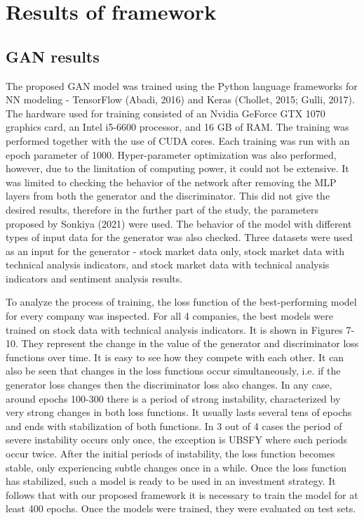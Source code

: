 \documentclass[review]{elsarticle} %
\begin{document}
\section{Results of framework}

\subsection{GAN results}

The proposed GAN model was trained using the Python language frameworks for NN modeling - TensorFlow (Abadi, 2016) and Keras (Chollet, 2015; Gulli, 2017). The hardware used for training consisted of an Nvidia GeForce GTX 1070 graphics card, an Intel i5-6600 processor, and 16 GB of RAM. The training was performed together with the use of CUDA cores. Each training was run with an epoch parameter of 1000. Hyper-parameter optimization was also performed,  however, due to the limitation of computing power, it could not be extensive. It was limited to checking the behavior of the network after removing the MLP layers from both the generator and the discriminator. This did not give the desired results, therefore in the further part of the study, the parameters proposed by Sonkiya (2021) were used. The behavior of the model with different types of input data for the generator was also checked. Three datasets were used as an input for the generator - stock market data only, stock market data with technical analysis indicators, and stock market data with technical analysis indicators and sentiment analysis results.

To analyze the process of training, the loss function of the best-performing model for every company was inspected. For all 4 companies, the best models were trained on stock data with technical analysis indicators. It is shown in Figures 7-10. They represent the change in the value of the generator and discriminator loss functions over time. It is easy to see how they compete with each other. It can also be seen that changes in the loss functions occur simultaneously, i.e. if the generator loss changes then the discriminator loss also changes. In any case, around epochs 100-300 there is a period of strong instability, characterized by very strong changes in both loss functions. It usually lasts several tens of epochs and ends with stabilization of both functions. In 3 out of 4 cases the period of severe instability occurs only once, the exception is UBSFY where such periods occur twice. After the initial periods of instability, the loss function becomes stable, only experiencing subtle changes once in a while. Once the loss function has stabilized, such a model is ready to be used in an investment strategy. It follows that with our proposed framework it is necessary to train the model for at least 400 epochs. Once the models were trained, they were evaluated on test sets. 
\end{document}
